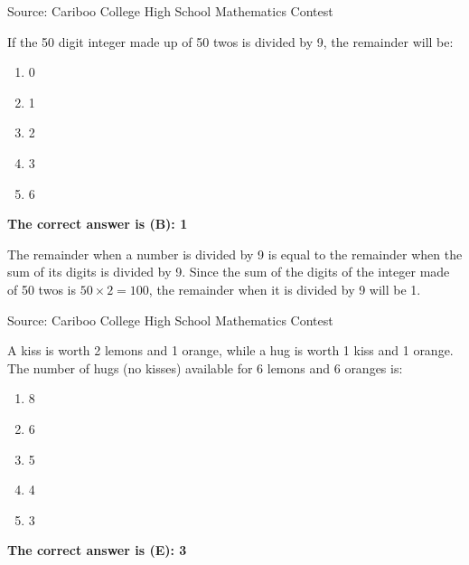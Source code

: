\documentclass{article}
\begin{document}
\vskip 1.5cm


\scriptsize
Source: Cariboo College High School Mathematics Contest

\normalsize
If the 50 digit integer made up of 50 twos is divided by 9, the remainder will be:
\begin{enumerate}[noitemsep,topsep=0mm,leftmargin=*,widest=D,label=\Alph*)]
	\item 0
	\item 1
	\item 2
	\item 3
	\item 6
\end{enumerate}

\textbf{The correct answer is (B): 1}

The remainder when a number is divided by 9 is equal to the remainder when the sum of its digits is divided by 9. Since the sum of the digits of the integer made of 50 twos is $50\times2=100$, the remainder when it is divided by 9 will be 1.

\vskip 1.5cm


\scriptsize
Source: Cariboo College High School Mathematics Contest

\normalsize
A kiss is worth 2 lemons and 1 orange, while a hug is worth 1 kiss and 1 orange. The number of hugs (no kisses) available for 6 lemons and 6 oranges is:
\begin{enumerate}[noitemsep,topsep=0mm,leftmargin=*,widest=D,label=\Alph*)]
	\item 8
	\item 6
	\item 5
	\item 4
	\item 3
\end{enumerate}

\textbf{The correct answer is (E): 3}
\end{document}
